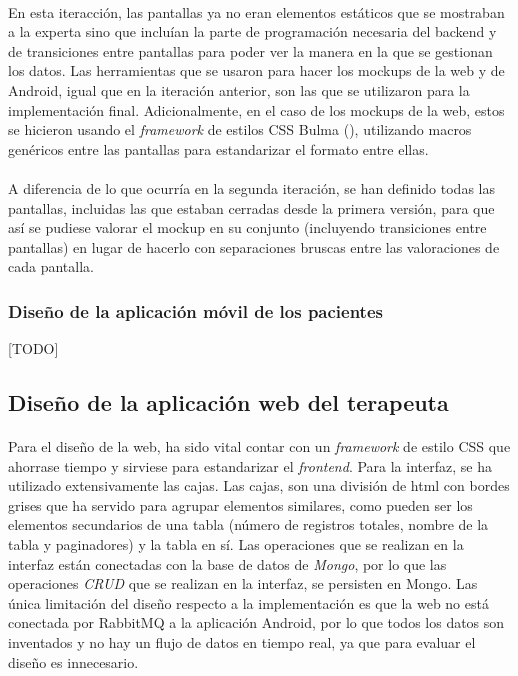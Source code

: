 \paragraph{}
En esta iteracción, las pantallas ya no eran elementos estáticos que se mostraban a la experta sino que incluían la parte de programación necesaria del backend y de transiciones entre pantallas para poder ver la manera en la que se gestionan los datos. Las herramientas que se usaron para hacer los mockups de la web y de Android, igual que en la iteración anterior, son las que se utilizaron para la implementación final. Adicionalmente, en el caso de los mockups de la web, estos se hicieron usando el \textit{framework} de estilos CSS Bulma (\citep{responsivelearning}), utilizando macros genéricos entre las pantallas para estandarizar el formato entre ellas.

\paragraph{}
A diferencia de lo que ocurría en la segunda iteración, se han definido todas las pantallas, incluidas las que estaban cerradas desde la primera versión, para que así se pudiese valorar el mockup en su conjunto (incluyendo transiciones entre pantallas) en lugar de hacerlo con separaciones bruscas entre las valoraciones de cada pantalla.

\subsubsection{Diseño de la aplicación móvil de los pacientes}
[TODO]

\subsection{Diseño de la aplicación web del terapeuta}
\paragraph{}
Para el diseño de la web, ha sido vital contar con un \textit{framework} de estilo CSS que ahorrase tiempo y sirviese para estandarizar el \textit{frontend}. Para la interfaz, se ha utilizado extensivamente las cajas. Las cajas, son una división de html con bordes grises que ha servido para agrupar elementos similares, como pueden ser los elementos secundarios de una tabla (número de registros totales, nombre de la tabla y paginadores) y la tabla en sí. Las operaciones que se realizan en la interfaz están conectadas con la base de datos de \textit{Mongo}, por lo que las operaciones \textit{CRUD} que se realizan en la interfaz, se persisten en Mongo. Las única limitación del diseño respecto a la implementación es que la web no está conectada por RabbitMQ a la aplicación Android, por lo que todos los datos son inventados y no hay un flujo de datos en tiempo real, ya que para evaluar el diseño es innecesario.

